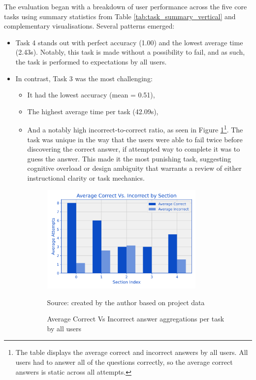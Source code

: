 The evaluation began with a breakdown of user performance across the five core tasks using summary statistics from Table \ref{tab:task_summary_vertical} and complementary visualisations.
Several patterns emerged:
\begin{itemize}
        \item Task 4 stands out with perfect accuracy (1.00) and the lowest average time (2.43s). 
        Notably, this task is made without a possibility to fail, and as such, the task is performed to expectations by all users.
        \item In contrast, Task 3 was the most challenging:
        \begin{itemize}
            \item It had the lowest accuracy (mean = 0.51),
            \item The highest average time per task (42.09s),
            \item And a notably high incorrect-to-correct ratio, as seen in Figure \ref{fig:corr_incorr}\footnote{The table displays the average correct and incorrect answers by all users. All users had to answer all of the questions correctly, so the average correct answers is static across all attempts.}. 
            The task was unique in the way that the users were able to fail twice before discovering the correct answer, if attempted way to complete it was to guess the answer. 
            This made it the most punishing task, suggesting cognitive overload or design ambiguity that warrants a review of either instructional clarity or task mechanics. 
            \begin{figure}[hbtp]
        \centering
        \includegraphics[width=0.8\textwidth]{figures/mean_correct_incorrect.png}
        \caption{Average Correct Vs Incorrect answer aggregations per task by all users}
        \label{fig:corr_incorr}
        {\raggedright \small{Source: created by the author based on project data}\par}

\end{figure}
\end{itemize}
\end{itemize}
